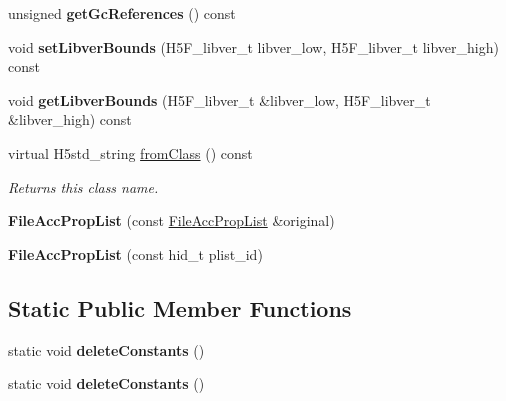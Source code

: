 \begin{DoxyCompactItemize}
unsigned {\bfseries get\+Gc\+References} () const
\item 
\mbox{\label{class_h5_1_1_file_acc_prop_list_a881f2d2a418e2ce3593c253a12a7e4c9}} 
void {\bfseries set\+Libver\+Bounds} (H5\+F\+\_\+libver\+\_\+t libver\+\_\+low, H5\+F\+\_\+libver\+\_\+t libver\+\_\+high) const
\item 
\mbox{\label{class_h5_1_1_file_acc_prop_list_a3fd4c6a9d5e6cff8263315aabb558d26}} 
void {\bfseries get\+Libver\+Bounds} (H5\+F\+\_\+libver\+\_\+t \&libver\+\_\+low, H5\+F\+\_\+libver\+\_\+t \&libver\+\_\+high) const
\item 
\mbox{\label{class_h5_1_1_file_acc_prop_list_a91008d21823c623382ab9c6e6640f67d}} 
virtual H5std\+\_\+string \hyperlink{class_h5_1_1_file_acc_prop_list_a91008d21823c623382ab9c6e6640f67d}{from\+Class} () const
\begin{DoxyCompactList}\small\item\em Returns this class name. \end{DoxyCompactList}\item 
\mbox{\label{class_h5_1_1_file_acc_prop_list_acc36fcd3f6528a94c5521048b1350716}} 
{\bfseries File\+Acc\+Prop\+List} (const \hyperlink{class_h5_1_1_file_acc_prop_list}{File\+Acc\+Prop\+List} \&original)
\item 
\mbox{\label{class_h5_1_1_file_acc_prop_list_abc2e5471cd17a7ff0b81d2cab58aead8}} 
{\bfseries File\+Acc\+Prop\+List} (const hid\+\_\+t plist\+\_\+id)
\end{DoxyCompactItemize}
\subsection*{Static Public Member Functions}
\begin{DoxyCompactItemize}
\item 
\mbox{\label{class_h5_1_1_file_acc_prop_list_a424c7b42e45231da27cf9a9b78e744b0}} 
static void {\bfseries delete\+Constants} ()
\item 
\mbox{\label{class_h5_1_1_file_acc_prop_list_a424c7b42e45231da27cf9a9b78e744b0}} 
static void {\bfseries delete\+Constants} ()
\end{DoxyCompactItemize}
